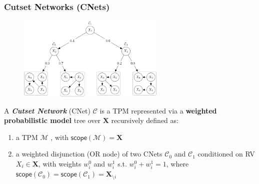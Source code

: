 \documentclass[xcolor={usenames,dvipsnames,svgnames}, compress]{beamer}
\begin{document}
\begin{frame}[t]
  \frametitle{Cutset Networks (CNets)}
  \footnotesize
  \vspace{-10pt}
  \begin{figure}
     \centering
     \includegraphics[width=7cm]{figures/csn}
  \label{fig:csn}
\end{figure}
\vspace{-10pt}
  A \emph{\textbf{Cutset Network}} (CNet) $\mathcal{C}$ is a TPM represented via a
  \textbf{weighted probabilistic model} tree over $\mathbf{X}$ 
    recursively defined as: %
    \begin{enumerate}
    \item a TPM $\mathcal{M}$  , with
       $\mathsf{scope}(\mathcal{M})=\mathbf X$
      \item a weighted  disjunction (OR node) of two CNets $\mathcal C_0$ and $\mathcal C_1$
     conditioned on RV $X_i \in \mathbf X$,  with
    weights $w_i^0$ and $w_i^1$ s.t. $w_i^0 + w_i^1 = 1$,
    where $\mathsf{scope}(\mathcal C_{0})=\mathsf{scope}(\mathcal C_{1})=\mathbf X_{\setminus i}$
    \end{enumerate}
    
  \end{frame}
\end{document}

